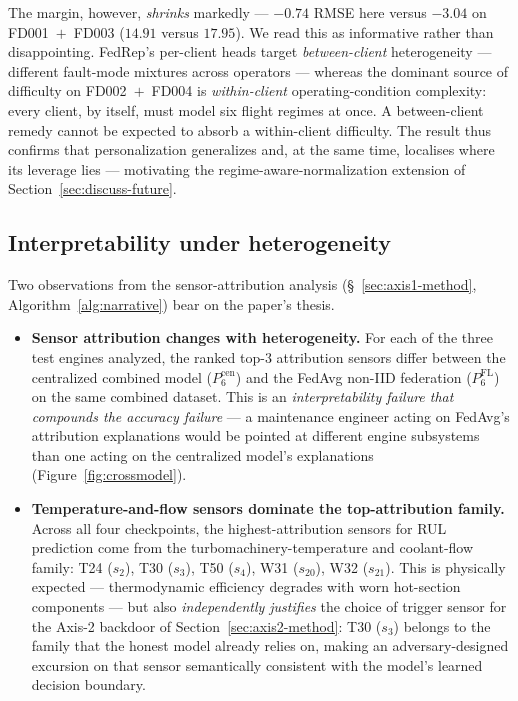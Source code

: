 \documentclass[a4paper,fleqn,doubleblind]{cas-sc}
\begin{document}
The margin, however, \emph{shrinks} markedly --- $-0.74$ RMSE here
versus $-3.04$ on FD001~$+$~FD003 ($14.91$ versus $17.95$). We read
this as informative rather than disappointing. FedRep's per-client
heads target \emph{between-client} heterogeneity --- different
fault-mode mixtures across operators --- whereas the dominant source
of difficulty on FD002~$+$~FD004 is \emph{within-client}
operating-condition complexity: every client, by itself, must model
six flight regimes at once. A between-client remedy cannot be
expected to absorb a within-client difficulty. The result thus
confirms that personalization generalizes and, at the same time,
localises where its leverage lies --- motivating the
regime-aware-normalization extension of
Section~\ref{sec:discuss-future}.

\subsection{Interpretability under heterogeneity}
\label{sec:axis1-results-attribution}

Two observations from the sensor-attribution analysis
(\S~\ref{sec:axis1-method}, Algorithm~\ref{alg:narrative}) bear on the
paper's thesis.

\begin{itemize}
    \item \textbf{Sensor attribution changes with heterogeneity.} For each of the three test engines analyzed, the ranked top-3 attribution sensors differ between the centralized combined model ($P_6^{\mathrm{cen}}$) and the FedAvg non-IID federation ($P_6^{\mathrm{FL}}$) on the same combined dataset. This is an \emph{interpretability failure that compounds the accuracy failure} --- a maintenance engineer acting on FedAvg's attribution explanations would be pointed at different engine subsystems than one acting on the centralized model's explanations (Figure~\ref{fig:crossmodel}).
    \item \textbf{Temperature-and-flow sensors dominate the top-attribution family.} Across all four checkpoints, the highest-attribution sensors for RUL prediction come from the turbomachinery-temperature and coolant-flow family: T24 ($s_2$), T30 ($s_3$), T50 ($s_4$), W31 ($s_{20}$), W32 ($s_{21}$). This is physically expected --- thermodynamic efficiency degrades with worn hot-section components --- but also \emph{independently justifies} the choice of trigger sensor for the Axis-2 backdoor of Section~\ref{sec:axis2-method}: T30 ($s_3$) belongs to the family that the honest model already relies on, making an adversary-designed excursion on that sensor semantically consistent with the model's learned decision boundary.
\end{itemize}
\end{document}
